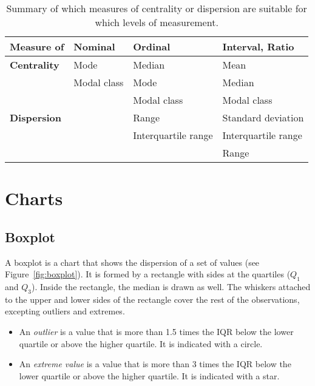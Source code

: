 \begin{table}
  \centering
  \begin{tabular}{|l|l|l|l|}
  	\hline
  	\textbf{Measure of} & \textbf{Nominal} & \textbf{Ordinal}    & \textbf{Interval}, \textbf{Ratio} \\ \hline
  	\textbf{Centrality} & Mode             & Median              & Mean                              \\
  	                    & Modal class      & Mode                & Median                            \\
  	                    &                  & Modal class         & Modal class                       \\ \hline
  	\textbf{Dispersion} &                  & Range               & Standard deviation                \\
  	                    &                  & Interquartile range & Interquartile range               \\
  	                    &                  &                     & Range                             \\ \hline
  \end{tabular}
  \caption{Summary of which measures of centrality or dispersion are suitable for which levels of measurement.}
  \label{tab:levels-of-measurement}
\end{table}

\section{Charts}
\label{sec:charts}

\subsection{Boxplot}
\label{ssec:boxplot}

A boxplot is a chart that shows the dispersion of a set of values (see Figure~\ref{fig:boxplot}). It is formed by a rectangle with sides at the quartiles ($Q_1$ and $Q_3$). Inside the rectangle, the median is drawn as well. The whiskers attached to the upper and lower sides of the rectangle cover the rest of the observations, excepting outliers and extremes.

\begin{itemize}
  \item An \emph{outlier} is a value that is more than 1.5 times the IQR below the lower quartile or above the higher quartile. It is indicated with a circle.
  \item An \emph{extreme value} is a value that is more than 3 times the IQR below the lower quartile or above the higher quartile. It is indicated with a star.
\end{itemize}

